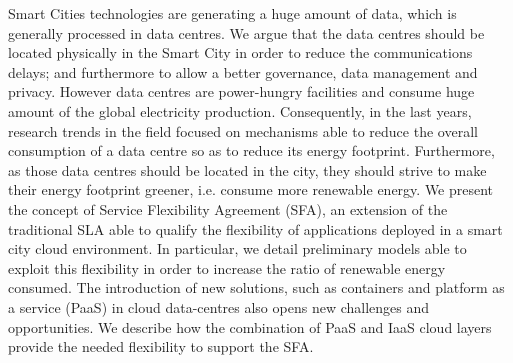Smart Cities technologies are generating a huge amount of data, which is generally processed in data centres.
We argue that the data centres should be located physically in the Smart City in order to reduce the communications delays; and furthermore to allow a better governance, data management and privacy.
However data centres are power-hungry facilities and consume huge amount of the global electricity production.
Consequently, in the last years, research trends in the field focused on mechanisms able to reduce the overall consumption of a data centre so as to reduce its energy footprint.
Furthermore, as those data centres should be located in the city, they should strive to make their energy footprint greener, i.e. consume more renewable energy.
We present the concept of Service Flexibility Agreement (SFA), an extension of the traditional SLA able to qualify the flexibility of applications deployed in a smart city cloud environment.
In particular, we detail preliminary models able to exploit this flexibility in order to increase the ratio of renewable energy consumed.
The introduction of new solutions, such as containers and platform as a service (PaaS) in cloud data-centres also opens new challenges and opportunities.
We describe how the combination of PaaS and IaaS cloud layers provide the needed flexibility to support the SFA.